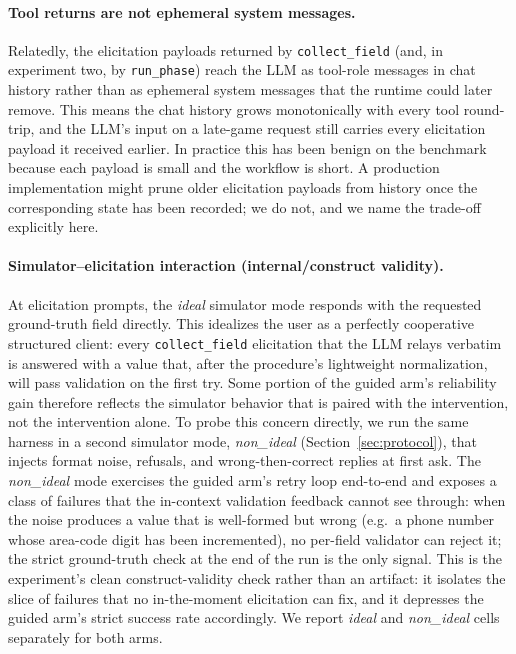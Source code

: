 \documentclass[11pt,a4paper]{article}
\begin{document}
\paragraph{Tool returns are not ephemeral system messages.}
Relatedly, the elicitation payloads returned by \texttt{collect\_field} (and, in experiment two, by \texttt{run\_phase}) reach the LLM as tool-role messages in chat history rather than as ephemeral system messages that the runtime could later remove. This means the chat history grows monotonically with every tool round-trip, and the LLM's input on a late-game request still carries every elicitation payload it received earlier. In practice this has been benign on the benchmark because each payload is small and the workflow is short. A production implementation might prune older elicitation payloads from history once the corresponding state has been recorded; we do not, and we name the trade-off explicitly here.

\paragraph{Simulator--elicitation interaction (internal/construct validity).}
At elicitation prompts, the \emph{ideal} simulator mode responds with the requested ground-truth field directly. This idealizes the user as a perfectly cooperative structured client: every \texttt{collect\_field} elicitation that the LLM relays verbatim is answered with a value that, after the procedure's lightweight normalization, will pass validation on the first try. Some portion of the guided arm's reliability gain therefore reflects the simulator behavior that is paired with the intervention, not the intervention alone. To probe this concern directly, we run the same harness in a second simulator mode, \emph{non\_ideal} (Section~\ref{sec:protocol}), that injects format noise, refusals, and wrong-then-correct replies at first ask. The \emph{non\_ideal} mode exercises the guided arm's retry loop end-to-end and exposes a class of failures that the in-context validation feedback cannot see through: when the noise produces a value that is well-formed but wrong (e.g.\ a phone number whose area-code digit has been incremented), no per-field validator can reject it; the strict ground-truth check at the end of the run is the only signal. This is the experiment's clean construct-validity check rather than an artifact: it isolates the slice of failures that no in-the-moment elicitation can fix, and it depresses the guided arm's strict success rate accordingly. We report \emph{ideal} and \emph{non\_ideal} cells separately for both arms.
\end{document}
